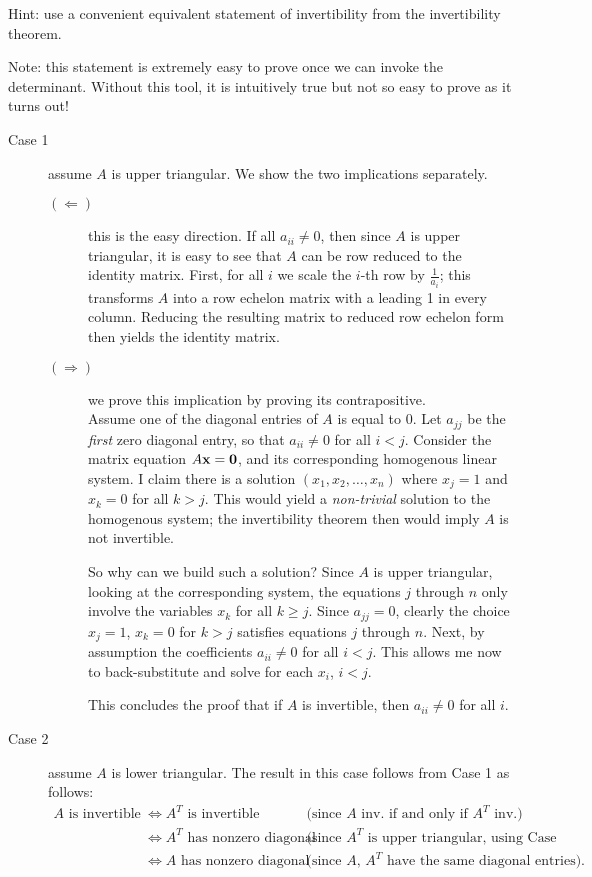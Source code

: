 Hint: use a convenient equivalent statement of invertibility from the invertibility theorem. 
\begin{solution}\noindent
Note: this statement is extremely easy to prove once we can invoke the determinant. Without this tool, it is intuitively true but not so easy to prove as it turns out! 
\begin{description}
\item[Case 1] assume $A$ is upper triangular. We show the two implications separately. 
\begin{description}
\item[$(\Longleftarrow)$] this is the easy direction. If all $a_{ii}\ne 0$, then since $A$ is upper triangular, it is easy to see that $A$ can be row reduced to the identity matrix. First, for all $i$ we scale the $i$-th row by $\frac{1}{a_{i}}$; this transforms $A$ into a row echelon matrix with a leading 1 in every column. Reducing the resulting matrix to reduced row echelon form then yields the identity matrix. 
\item[$(\Longrightarrow)$] we prove this implication by proving its contrapositive. 
\\
Assume one of the diagonal entries of $A$ is equal to 0. Let $a_{jj}$ be the {\em first} zero diagonal entry, so that $a_{ii}\ne 0$ for all $i<j$. Consider the matrix equation $A{\mathbf x}={\mathbf 0}$, and its corresponding homogenous linear system. I claim there is a solution $(x_1,x_2,\dots, x_n)$ where $x_j=1$ and $x_k=0$ for all $k>j$. This would yield a {\em non-trivial} solution to the homogenous system; the invertibility theorem then would imply $A$ is not invertible. 

So why can we build such a solution? Since $A$ is upper triangular, looking at the corresponding system, the equations $j$ through $n$ only involve the variables $x_k$ for all $k\geq j$. Since $a_{jj}=0$, clearly the choice $x_j=1$, $x_k=0$ for $k>j$ satisfies equations $j$ through $n$. Next, by assumption the coefficients  $a_{ii}\ne 0$ for all $i<j$. This allows me now to back-substitute and solve for each $x_i$, $i<j$. 

This concludes the proof that if $A$ is invertible, then $a_{ii}\ne 0$ for all $i$.  
\end{description}
\item[Case 2] assume $A$ is lower triangular. The result in this case follows from Case 1 as follows:
\begin{align*}
\text{$A$ is invertible}&\Longleftrightarrow \text{$A^T$ is invertible} &\text{(since $A$ inv. if and only if $A^T$ inv.) }\\
&\Longleftrightarrow \text{$A^T$ has nonzero diagonal entries} &\text{(since $A^T$ is upper triangular, using Case 1)}\\
&\Longleftrightarrow \text{$A$ has nonzero diagonal entries} &\text{(since $A$, $A^T$ have the same diagonal entries).}
\end{align*}
\end{description}

\end{solution}
